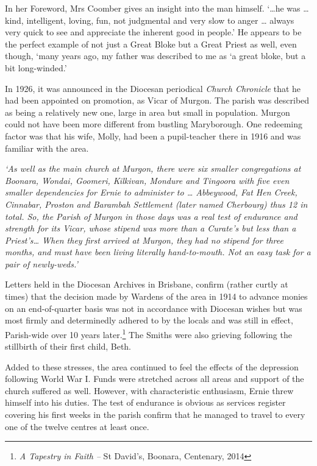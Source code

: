 In her Foreword, Mrs Coomber gives an insight into the man himself. `\ldots he was \ldots{} kind, intelligent, loving, fun, not judgmental and very slow to anger \ldots{} always very quick to see and appreciate the inherent good in people.' He appears to be the perfect example of not just a Great Bloke but a Great Priest as well, even though, `many years ago, my father was described to me as `a great bloke, but a bit long-winded.'



In 1926, it was announced in the Diocesan periodical \emph{Church Chronicle} that he had been appointed on promotion, as Vicar of Murgon. The parish was described as being a relatively new one, large in area but small in population. Murgon could not have been more different from bustling Maryborough. One redeeming factor was that his wife, Molly, had been a pupil-teacher there in 1916 and was familiar with the area.



\emph{`As well as the main church at Murgon, there were six smaller congregations at Boonara, Wondai, Goomeri, Kilkivan, Mondure and Tingoora with five even smaller dependencies for Ernie to administer to \ldots{} Abbeywood, Fat Hen Creek, Cinnabar, Proston and Barambah Settlement (later named Cherbourg) thus 12 in total. So, the Parish of Murgon in those days was a real test of endurance and strength for its Vicar, whose stipend was more than a Curate's but less than a Priest's\ldots{} When they first arrived at Murgon, they had no stipend for three months, and must have been living literally hand-to-mouth. Not an easy task for a pair of newly-weds.'}



Letters held in the Diocesan Archives in Brisbane, confirm (rather curtly at times) that the decision made by Wardens of the area in 1914 to advance monies on an end-of-quarter basis was not in accordance with Diocesan wishes but was most firmly and determinedly adhered to by the locals and was still in effect, Parish-wide over 10 years later.\footnote{\emph{A Tapestry in Faith --} St David's, Boonara, Centenary, 2014} The Smiths were also grieving following the stillbirth of their first child, Beth.


Added to these stresses, the area continued to feel the effects of the depression following World War I. Funds were stretched across all areas and support of the church suffered as well. However, with characteristic enthusiasm, Ernie threw himself into his duties. The test of endurance is obvious as services register covering his first weeks in the parish confirm that he managed to travel to every one of the twelve centres at least once.



